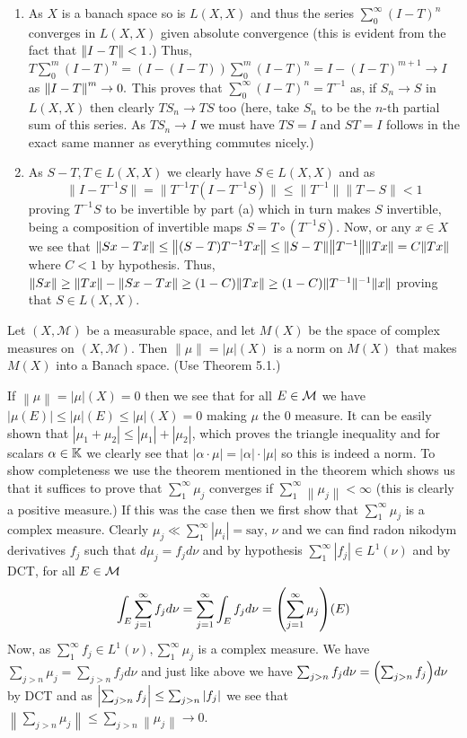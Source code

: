 \documentclass[12pt,a4paper]{article}
\begin{document}
\begin{solution}
\begin{enumerate}[label=\alph*.]
    \item As $X$ is a banach space so is $L(X,X)$ and thus the series $\sum_0^\infty(I-T)^n$ converges in $L(X,X)$ given absolute convergence (this is evident from the fact that $\norm{I-T}<1$.) 
    Thus, $T\sum_0^m(I-T)^n=(I-(I-T))\sum_0^m(I-T)^n=I-(I-T)^{m+1}\to I$ as $ \norm{I-T}^m\to 0.$ 
    This proves that $\sum_0^\infty(I-T)^n=T^{-1}$ as, if $S_n\to S$ in $L(X,X)$ then clearly $TS_n\to TS$ too (here, take $S_n$ to be the $n$-th partial sum of this series. As $TS_n\to I$ we must have $TS=I$ and $ST=I$ follows in the exact same manner as everything commutes nicely.)   
\item As $S-T,T\in L(X,X)$ we clearly have $S\in L(X,X)$ and as 
    \[
        \|I-T^{-1}S\|=\|T^{-1}T(I-T^{-1}S)\|\leq\|T^{-1}\|\|T-S\|<1 
    \]
    proving $T^{-1}S$ to be invertible by part (a) which in turn makes $S$ invertible, being a composition of invertible maps $S=T\circ(T^{-1}S).$ 
    Now, or any $x\in X$ we see that $ \norm{Sx-Tx}\leq\norm{(S-T)T^{-1}Tx}\leq\norm{S-T} \norm{T^{-1}}\norm{Tx}=C\norm{Tx}$ where $C<1$ by hypothesis. 
    Thus, $ \norm{Sx}\geq \norm{Tx}-\norm{Sx-Tx}\geq (1-C) \norm{Tx}\geq(1-C)\|T^{-1}\|^{-1}\norm{x}$ proving that $S\in L(X,X).$ 
\end{enumerate}
\end{solution}
\begin{problem}\label{prob:5-8}
Let $(X,\mathcal{M})$ be a measurable space, and let $M(X)$ be the space of complex measures on $(X,\mathcal{M})$. Then $\|\mu\| = |\mu|(X)$ is a norm on $M(X)$ that makes $M(X)$ into a Banach space. (Use Theorem 5.1.)
\end{problem}
\begin{solution}
If $ \left\|\mu\right\|=|\mu|(X)=0$ then we see that for all $E\in\mathcal{M}$ we have $|\mu(E)|\leq|\mu|(E)\leq|\mu|(X)=0$ making $\mu$ the $0$ measure. 
It can be easily shown that $|\mu_1+\mu_2|\leq|\mu_1|+|\mu_2|$, which proves the triangle inequality and for scalars $\alpha\in \mathbb{K}$ we clearly see that $|\alpha\cdot\mu|=|\alpha|\cdot|\mu|$ so this is indeed a norm. 
To show completeness we use the theorem mentioned in the theorem which shows us that it suffices to prove that $\sum_1^\infty\mu_j$ converges if $\sum_1^\infty \left\|\mu_j\right\|<\infty$ (this is clearly a positive measure.) 
If this was the case then we first show that $\sum_1^\infty\mu_j$ is a complex measure. 
Clearly $\mu_j\ll\sum_1^\infty|\mu_i|=\text{say, }\nu$ and we can find radon nikodym derivatives $f_j$ such that $d\mu_j=f_jd\nu$ and by hypothesis $\sum_1^\infty|f_j|\in L^1(\nu)$ and by DCT, for all $E\in\mathcal{M}$ 
\[
    \int_E\sum_{j=1}^\infty f_jd\nu=\sum_{j=1}^\infty\int_Ef_jd\nu= \qty(\sum_{j=1}^\infty\mu_j)(E)
\]
Now, as $\sum_1^\infty f_j\in L^1(\nu), \sum_1^\infty\mu_j$ is a complex measure. 
We have $\sum_{j>n}\mu_j=\sum_{j>n}f_jd\nu$ and just like above we have $\sum_{j>n}f_jd\nu= \qty(\sum_{j>n}f_j)d\nu$ by DCT and as $\qty|\sum_{j>n}f_j|\leq\sum_{j>n}|f_j|$ we see that $ \left\|\sum_{j>n}\mu_j\right\|\leq\sum_{j>n} \left\|\mu_j\right\|\to 0.$
\end{solution}
\end{document}
